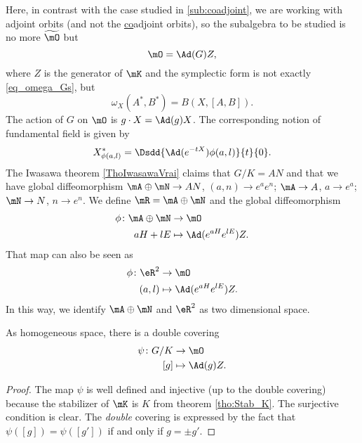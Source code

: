 Here, in contrast with the case studied in \ref{sub:coadjoint}, we are working with adjoint orbits (and not the \underline{co}adjoint orbits), so the subalgebra to be studied is no more $\widetilde{\mO}$ but
\[
    \mO=\Ad(G)Z,
\]
where $Z$ is the generator of $\mK$ and the symplectic form is not exactly \eqref{eq_omega_Gs}, but
\begin{equation}\label{eq:omega_G}
  \omega_X(A^*,B^*)=B(X,[A,B]).
\end{equation}
The action of $G$ on $\mO$ is $g\cdot X=\Ad(g)X$. The corresponding notion of fundamental field is given by
\[
   X^*_{\phi(a,l)}=\Dsdd{ \Ad(e^{-tX})\phi(a,l) }{t}{0}.
\]
The Iwasawa theorem \ref{ThoIwasawaVrai} claims that $G/K=AN$ and that we have global diffeomorphism $\mA\oplus\mN\to AN$, $(a,n)\to e^ae^n$; $\mA\to A$, $a\to e^a$; $\mN\to N$, $n\to e^n$. We define $\mR=\mA\oplus\mN$ and the global diffeomorphism 
\begin{equation}    \label{EqDefphiaHlEZ}
\begin{aligned}
 \phi\colon \mA\oplus\mN&\to \mO \\ 
 aH+lE&\mapsto \Ad( e^{aH} e^{lE})Z.
\end{aligned}
\end{equation}
 That map can also be seen as 
\begin{equation}
\begin{aligned}
 \phi\colon\eR^2&\to \mO \\ 
(a,l)&\mapsto\Ad(e^{aH}e^{lE})Z.
\end{aligned}
\end{equation}
 In this way, we identify $\mA\oplus\mN$ and $\eR^2$ as two dimensional space.
\begin{proposition}
As homogeneous space, there is a double covering
\begin{equation}
\begin{aligned}
 \psi\colon G/K&\to \mO \\ 
[g]&\mapsto \Ad(g)Z. 
\end{aligned}
\end{equation}

\end{proposition}
\begin{proof}
The map $\psi$ is well defined and injective (up to the double covering) because the stabilizer of $\mK$ is $K$ from theorem \ref{tho:Stab_K}. The surjective condition is clear. The \emph{double} covering is expressed by the fact that $\psi([g])=\psi([g'])$ if and only if $g=\pm g'$.
\end{proof}

